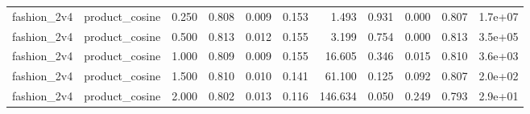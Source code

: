\begin{table}
\begin{tabular}{llrrrrrrrrl}
fashion\_2v4 & product\_cosine & 0.250 & 0.808 & 0.009 & 0.153 & 1.493 & 0.931 & 0.000 & 0.807 & 1.7e+07 \\
fashion\_2v4 & product\_cosine & 0.500 & 0.813 & 0.012 & 0.155 & 3.199 & 0.754 & 0.000 & 0.813 & 3.5e+05 \\
fashion\_2v4 & product\_cosine & 1.000 & 0.809 & 0.009 & 0.155 & 16.605 & 0.346 & 0.015 & 0.810 & 3.6e+03 \\
fashion\_2v4 & product\_cosine & 1.500 & 0.810 & 0.010 & 0.141 & 61.100 & 0.125 & 0.092 & 0.807 & 2.0e+02 \\
fashion\_2v4 & product\_cosine & 2.000 & 0.802 & 0.013 & 0.116 & 146.634 & 0.050 & 0.249 & 0.793 & 2.9e+01 \\
\bottomrule
\end{tabular}
\end{table}
